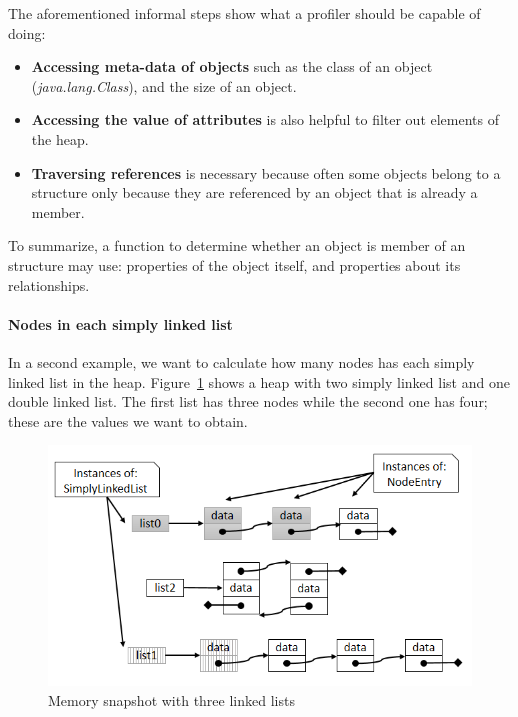 The aforementioned informal steps show what a profiler should be capable of doing:

\begin{itemize}
\item \textbf{Accessing meta-data of objects} such as the class of an object (\textit{java.lang.Class}), and the size of an object. 

\item \textbf{Accessing the value of attributes} is also helpful to filter out elements of the heap.

\item \textbf{Traversing references} is necessary because often some objects belong to a structure only because they are referenced by an object that is already a member.
\end{itemize}

To summarize, a function to determine whether an object is member of an structure may use: properties of the object itself, and properties about its relationships.



\paragraph{Nodes in each simply linked list}

In a second example, we want to calculate how many nodes has each simply linked list in the heap.
Figure~\ref{fig:simple_snapshot} shows a heap with two simply linked list and one double linked list.
The first list has three nodes while the second one has four; these are the values we want to obtain.


\begin{figure}[!ht]
\centering
\includegraphics[width=0.65\linewidth]{chapter6/fig/lists}
\caption{Memory snapshot with three linked lists}
\label{fig:simple_snapshot}
\end{figure}


